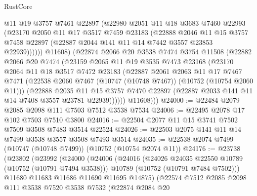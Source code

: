\begin{lexlean}{RustCore}
\begin{coremodule}
              @11
              @19
              @3757
              @7461
              @22897
              (@22980
                @2051
                @11
                @18
                @3683
                @7460
                @22993
                (@23170
                  @2050
                  @11
                  @17
                  @3517
                  @7459
                  @23183
                  (@22888
                    @2046
                    @11
                    @15
                    @3757
                    @7458
                    @22897
                    (@22887 @2044 @141 @11 @14 @7442 @3557 @23853 @22939))))))
          @11608)
        (@22874
          @2066
          @20
          @3538
          @7474
          @3754
          @11508
          (@22882
            @2066
            @20
            @7474
            (@23159
              @2065
              @11
              @19
              @3535
              @7473
              @23168
              (@23170
                @2064
                @11
                @18
                @3517
                @7472
                @23183
                (@22887
                  @2061
                  @2063
                  @11
                  @17
                  @7467
                  @7471
                  (@22538 @2060 @7467 (@10747 (@10748 @7467)) (@10752 (@10754 @2060 @11)))
                  (@22888
                    @2035
                    @11
                    @15
                    @3757
                    @7470
                    @22897
                    (@22887 @2033 @141 @11 @14 @7408 @3557 @23781 @22939))))))
          @11608)))
@24000 := @22484 @2079 @2085 @2098 @111 @7503 @7512 @3538 @7534
@24006 := @22495 @2078 @17 @102 @7503 @7510 @3800
@24016 := @22504 @2077 @11 @15 @3741 @7502 @7509 @3508 @7483 @3514 @22524
@24026 := @22503 @2075 @141 @11 @14 @7499 @3538 @3557 @3508 @7493 @3514
@24035 := @22538 @2074 @7499 (@10747 (@10748 @7499)) (@10752 (@10754 @2074 @11))
@24176 := @23738
    (@23802
      (@23992
        (@24000
          (@24006
            (@24016
              (@24026 @24035 @22550 @10789 (@10752 (@10791 @7494 @3538)))
              @10789
              (@10752 (@10791 @7484 @7502)))
            @11680
            @11683
            @11686
            @11690
            @11695
            @14875)
          (@22574
            @7512
            @2085
            @2098
            @111
            @3538
            @7520
            @3538
            @7532
            (@22874
              @2084
              @20

\end{coremodule}
\end{lexlean}
